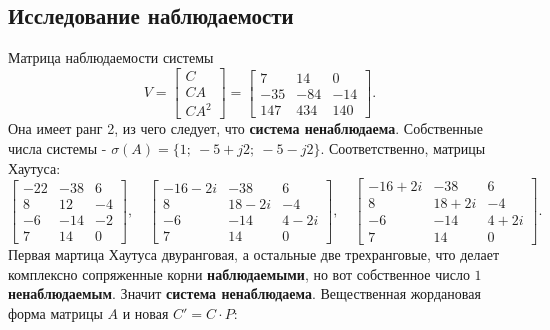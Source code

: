 \subsection{Исследование наблюдаемости}

Матрица наблюдаемости системы
\begin{equation*}
    V=\begin{bmatrix}
        C \\ CA \\ CA^2
    \end{bmatrix}
    =\begin{bmatrix}
        7&	14&	0\\
        -35&	-84&	-14\\
        147&	434&	140
    \end{bmatrix}.
\end{equation*}
Она имеет ранг 2, из чего следует, что \textbf{система ненаблюдаема}. 
Собственные
числа системы - $\sigma(A)=\{1;\ -5+j2;\ -5-j2\}$. Соответственно,
матрицы Хаутуса:
\begin{equation*}
    \begin{bmatrix}
        -22&	-38&	6\\
        8&	12&	-4\\
        -6&	-14&	-2\\
        7 & 14 & 0
    \end{bmatrix},\quad
    \begin{bmatrix}
        -16 - 2i&	-38&	6\\
        8&	18 - 2i&	-4\\
        -6&	-14&	4 - 2i\\
        7 & 14 & 0
    \end{bmatrix},\quad
    \begin{bmatrix}
        -16 + 2i&	-38&	6\\
8&	18 + 2i&	-4\\
-6&	-14&	4 + 2i\\
7 & 14 & 0
    \end{bmatrix}.
\end{equation*}
Первая мартица Хаутуса двуранговая, а остальные две трехранговые, что делает
комплексно сопряженные корни \textbf{наблюдаемыми}, но вот собственное число
$1$ \textbf{ненаблюдаемым}. Значит \textbf{система ненаблюдаема}.
Вещественная жордановая форма матрицы $A$ и новая $C'=C\cdot P$:
